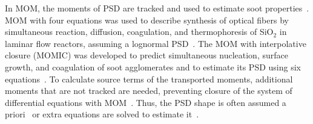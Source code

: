 In MOM, the moments of PSD are tracked and used to estimate soot properties~\citep{pratsinis1988simultaneous}. MOM with four equations was used to describe synthesis of optical fibers by simultaneous reaction, diffusion, coagulation, and thermophoresis of SiO$_2$ in laminar flow reactors, assuming a lognormal PSD~\citep{kim1988manufacture}. The MOM with interpolative closure (MOMIC) was developed to predict simultaneous nucleation, surface growth, and coagulation of soot agglomerates and to estimate its PSD using six equations~\citep{kazakov1998dynamic}. To calculate source terms of the transported moments, additional moments that are not tracked are needed, preventing closure of the system of differential equations with MOM~\citep{pratsinis1988simultaneous, frenklach1987aerosol}. Thus, the PSD shape is often assumed a priori~\citep{pratsinis1988simultaneous} or extra equations are solved to estimate it~\citep{kruis1993simple}.





